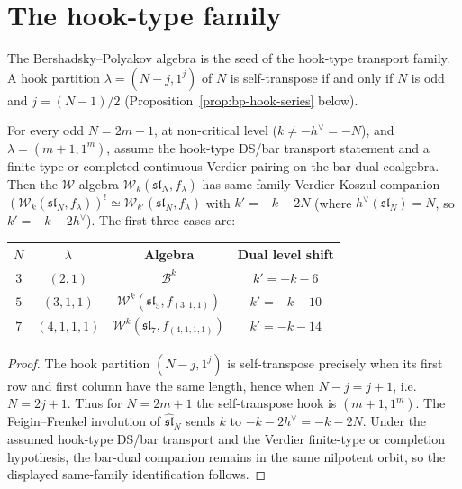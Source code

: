 \section{The hook-type family}\label{sec:bp-hook}

The Bershadsky--Polyakov algebra is the seed of the hook-type
transport family. A hook partition
$\lambda = (N-j, 1^j)$ of $N$ is self-transpose if and only if
$N$ is odd and $j = (N-1)/2$
(Proposition~\ref{prop:bp-hook-series} below).

\begin{proposition}
\label{prop:bp-hook-series}
For every odd $N = 2m+1$, at non-critical level
($k \neq -h^\vee = -N$), and $\lambda = (m+1, 1^m)$, assume the
hook-type DS/bar transport statement and a finite-type or completed
continuous Verdier pairing on the bar-dual coalgebra. Then the
$\mathcal{W}$-algebra
$\mathcal{W}_k(\mathfrak{sl}_N, f_\lambda)$ has same-family
Verdier-Koszul companion
$(\mathcal{W}_k(\mathfrak{sl}_N, f_\lambda))^!
\simeq
\mathcal{W}_{k'}(\mathfrak{sl}_N, f_\lambda)$
with $k' = -k - 2N$ \textup{(}where $h^\vee(\mathfrak{sl}_N) = N$,
so $k' = -k - 2h^\vee$\textup{)}.
The first three cases are:
\begin{center}
\renewcommand{\arraystretch}{1.2}
\begin{tabular}{cccc}
\toprule
$N$ & $\lambda$ & Algebra & Dual level shift \\
\midrule
$3$ & $(2,1)$ & $\mathcal{B}^k$ & $k' = -k - 6$ \\
$5$ & $(3,1,1)$ & $\mathcal{W}^k(\mathfrak{sl}_5, f_{(3,1,1)})$
 & $k' = -k - 10$ \\
$7$ & $(4,1,1,1)$ & $\mathcal{W}^k(\mathfrak{sl}_7, f_{(4,1,1,1)})$
 & $k' = -k - 14$ \\
\bottomrule
\end{tabular}
\end{center}
\end{proposition}

\begin{proof}
The hook partition $(N-j,1^j)$ is self-transpose precisely when its
first row and first column have the same length, hence when
$N-j=j+1$, i.e. $N=2j+1$. Thus for $N=2m+1$ the self-transpose hook is
$(m+1,1^m)$. The Feigin--Frenkel involution of
$\widehat{\mathfrak{sl}}_N$ sends $k$ to $-k-2h^\vee=-k-2N$.
Under the assumed hook-type DS/bar transport and the Verdier
finite-type or completion hypothesis, the bar-dual companion remains
in the same nilpotent orbit, so the displayed same-family
identification follows.
\end{proof}


